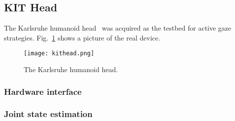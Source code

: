 \subsection{KIT Head}
\label{sec:kithead}

The Karlsruhe humanoid head~\cite{Asfour2008KITHead} was acquired as the testbed for active gaze strategies. Fig.~\ref{fig:kit_head} shows a picture of the real device.

\begin{figure}
\centering
\texttt{[image: kithead.png]}
\caption{The Karlsruhe humanoid head.}
\label{fig:kit_head}
\end{figure}

\subsubsection{Hardware interface}


\subsubsection{Joint state estimation}